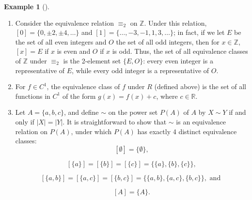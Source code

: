 \documentclass[10pt,]{book}
\theoremstyle{plain}
\theoremstyle{definition}
\theoremstyle{definition}
\theoremstyle{definition}
\newtheorem{example}[theorem]{Example}
\theoremstyle{definition}
\numberwithin{equation}{section}
\def\Z{\mathbb{Z}}
\def\R{\mathbb{R}}
\begin{document}
\begin{example}[]\label{example-68}
\leavevmode%
\begin{enumerate}
\item\hypertarget{li-402}{}
            Consider the equivalence relation \(\equiv_2\) on
            \(\Z\).  Under this relation, \([0]=\{0,\pm 2, \pm 4, \ldots\}\)
            and \([1]=\{\ldots, -3, -1, 1, 3, \ldots\}\); in fact, if we let
            \(E\) be the set of all even integers and \(O\) the set of all odd
            integers, then for \(x\in \Z\), \([x]=E\) if \(x\) is even and \(O\) if
            \(x\) is odd. Thus, the set of all equivalence classes of \(\Z\)
            under \(\equiv_2\) is the 2-element set \(\{E,O\}\): every even
            integer is a representative of \(E\), while every odd integer is
            a representative of \(O\).
\item\hypertarget{li-403}{}
            For \(f\in C^1\), the equivalence class of \(f\) under \(R\)
            (defined above)
            is
            the set of all functions in \(C^1\) of the
            form \(g(x)=f(x)+c\), where \(c\in \R\).
\item\hypertarget{li-404}{}
            Let \(A=\{a,b,c\}\), and define \(\sim\) on the power set \(P(A)\) of \(A\) by \(X\sim Y\) if
            and only if \(|X|=|Y|\). It is straightforward to show that \(\sim\) is
            an equivalence relation on \(P(A)\), under which \(P(A)\) has exactly 4
            distinct equivalence classes:
\begin{equation*}

              [\emptyset]=\{\emptyset\},
            
\end{equation*}

\begin{equation*}

              [\{a\}]=[\{b\}]=[\{c\}]=\{\{a\},\{b\}, \{c\}\},
            
\end{equation*}

\begin{equation*}

              [\{a,b\}]=[\{a,c\}]=[\{b,c\}]=\{\{a,b\},\{a,c\},\{b,c\}\}, \text{ and }
            
\end{equation*}

\begin{equation*}

              [A]=\{A\}.
            
\end{equation*}

\end{enumerate}
\end{example}
\end{document}
